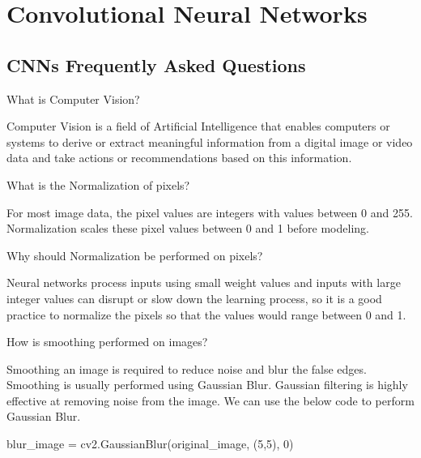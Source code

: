 	\chapter{Convolutional Neural Networks}
	\section{CNNs Frequently Asked Questions}

	\resetquestioncounter{}
	\begin{qanda}
		\begin{question}
 What is Computer Vision?
		\end{question}
		\begin{answer}
Computer Vision is a field of Artificial Intelligence that enables computers or systems to derive or extract meaningful information from a digital image or video data and take actions or recommendations based on this information.
		\end{answer}
	\end{qanda}

	\begin{qanda}
		\begin{question}
 What is the Normalization of pixels?
		\end{question}
		\begin{answer}
For most image data, the pixel values are integers with values between 0 and 255. Normalization scales these pixel values between 0 and 1 before modeling.
		\end{answer}
	\end{qanda}

	\begin{qanda}
		\begin{question}
Why should Normalization be performed on pixels?
		\end{question}
		\begin{answer}
Neural networks process inputs using small weight values and inputs with large integer values can disrupt or slow down the learning process, so it is a good practice to normalize the pixels so that the values would range between 0 and 1.
		\end{answer}
	\end{qanda}

	\begin{qanda}
		\begin{question}
How is smoothing performed on images?
		\end{question}
		\begin{answer}
Smoothing an image is required to reduce noise and blur the false edges. Smoothing is usually performed using Gaussian Blur. Gaussian filtering is highly effective at removing noise from the image. We can use the below code to perform Gaussian Blur.

		\begin{code}[\codenumbering]{}
			\codeitemnonumber blur\_image = cv2.GaussianBlur(original\_image, (5,5), 0)
		\end{code}
		\end{answer}
	\end{qanda}

